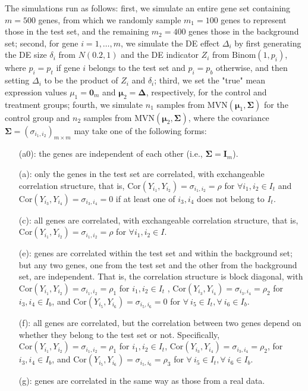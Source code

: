 \documentclass[11pt, a4paper]{article}
\begin{document}
		The simulations run as follows: first, we simulate an entire gene set containing $m=500$ genes, from which we randomly sample $m_1 = 100$ genes to represent those in the test set, and the remaining $m_2=400$ genes those in the background set; second, for gene $i=1, \ldots, m$, we simulate the DE effect $\Delta_i$ by first generating the DE size $\delta_i$ from $N(0.2, 1)$ and the DE indicator $Z_i$ from $\text{Binom}(1, p_i)$,  where $p_i= p_t$ if gene $i$ belongs to the test set and $p_i = p_b$  otherwise, and then setting $\Delta_i$ to be the product of $Z_i$ and $\delta_i$; third, we set the "true" mean expression values $\mu_1 = \bm 0_m$ and $\bm \mu_2 = \bm \Delta$, respectively,  for the control and treatment groups; fourth, we simulate $n_1$ samples from $\text{MVN}(\bm \mu_1, \bm \Sigma)$ for the control group and $n_2$ samples from $\text{MVN}(\bm \mu_2, \bm \Sigma)$, where the covariance $\bm \Sigma = (\sigma_{i_1, i_2})_{m\times m} $ may take one of the following forms: 
		\begin{enumerate}
			\item[(a0):] the genes are independent of each other (i.e., $\bm \Sigma = \bm I_m$).
			\item[(a):] only the genes in the test set are correlated, with exchangeable correlation structure, that is, $\text{Cor}(Y_{i_1}, Y_{i_2})=\sigma_{i_1, i_2}=\rho$ for $\forall i_1, i_2 \in I_t$ and  $\text{Cor}(Y_{i_3}, Y_{i_4})=\sigma_{i_3, i_4}=0$ if at least one of $i_3, i_4$ does not belong to $I_t$.
			\item[(c):] all genes are correlated, with exchangeable correlation structure, that is, $\text{Cor}(Y_{i_1}, Y_{i_2})=\sigma_{i_1, i_2}=\rho$ for $\forall i_1, i_2 \in I$.
			\item[(e):] genes are correlated within the test set and within the background set; but any two genes, one from the test set and the other from the background set, are independent. That is, the correlation structure is block diagonal, with $\text{Cor}(Y_{i_1}, Y_{i_2})= \sigma_{i_1, i_2}= \rho_1$ for $i_1, i_2 \in I_t$  , $\text{Cor}(Y_{i_3}, Y_{i_4}) = \sigma_{i_3, i_4}=\rho_2$ for $i_3, i_4\in I_b$, and  $\text{Cor}(Y_{i_5}, Y_{i_6})=\sigma_{i_5, i_6}= 0$ for $\forall ~i_5\in I_t, \forall~ i_6\in I_b$.
			\item[(f):] all genes are correlated, but the correlation between two genes depend on whether they belong to the test set or not. Specifically, $\text{Cor}(Y_{i_1}, Y_{i_2})=\sigma_{i_1, i_2}=\rho_1$  for $i_1, i_2 \in I_t$,    $\text{Cor}(Y_{i_3}, Y_{i_4})=\sigma_{i_3, i_4} =\rho_2$, for $ i_3, i_4\in I_b$, and  $\text{Cor}(Y_{i_5}, Y_{i_6})= \sigma_{i_5, i_6}= \rho_3$ for $\forall~ i_5\in I_t, \forall~ i_6\in I_b$.
			\item[(g):] genes are correlated in the same way as those from a real data.
		\end{enumerate}
		
\end{document}
